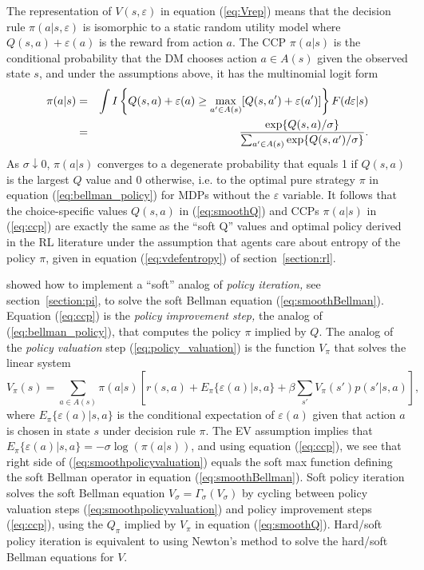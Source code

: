 The representation of $V(s,\varepsilon)$ in equation (\ref{eq:Vrep}) means that the decision rule $\pi(a|s,\varepsilon)$ 
is isomorphic to a static random utility model where $Q(s,a)+\varepsilon(a)$ is the reward from action $a$.
The CCP $\pi(a|s)$ is the conditional probability that the DM chooses action $a \in A(s)$
given the observed state $s$, and under the assumptions above, it has the multinomial logit form
\begin{eqnarray}
     \pi(a|s)  & =& \int I\left\{Q(s,a)+\varepsilon(a) \ge \max_{a' \in A(s)}[Q(s,a')+\varepsilon(a')]\right\}F(d\varepsilon|s)\nonumber \\
 &=&{ \exp\{Q(s,a)/\sigma\} \over \sum_{a' \in A(s)} \exp\{Q(s,a')/\sigma\}}.
\label{eq:ccp}
\end{eqnarray}
As $\sigma \downarrow 0$, $\pi(a|s)$ converges to a degenerate probability that equals 1 if 
$Q(s,a)$ is the largest $Q$ value  and 0 otherwise, i.e. to the optimal pure strategy $\pi$
 in equation (\ref{eq:bellman_policy}) for MDPs without the  $\varepsilon$ variable.
It follows that the choice-specific values $Q(s,a)$ in (\ref{eq:smoothQ}) and CCPs $\pi(a|s)$ in (\ref{eq:ccp})
are exactly the same as the ``soft Q'' values and optimal policy derived in the RL
literature under the assumption that agents care about entropy of the policy $\pi$, given in equation
(\ref{eq:vdefentropy}) of section~\ref{section:rl}.

\citet{AguirregabiriaMira:2002} showed how to implement a ``soft'' analog of {\it policy iteration,\/} see section~\ref{section:pi},
to solve the soft Bellman equation (\ref{eq:smoothBellman}). 
Equation (\ref{eq:ccp}) is the {\it policy improvement step,\/} the analog of (\ref{eq:bellman_policy}), that computes the  policy 
$\pi$ implied by $Q$. The  analog of the {\it policy valuation\/} step (\ref{eq:policy_valuation}) is 
the function $V_\pi$ that solves the linear system
\begin{equation}
   V_\pi(s) =\sum_{a \in A(s)} \pi(a|s)[r(s,a)+E_\pi\{\varepsilon(a)|s,a\}+\beta \sum_{s'} V_\pi(s')p(s'|s,a)],
\label{eq:smoothpolicyvaluation}
\end{equation}
where $E_\pi\{\varepsilon(a)|s,a\}$ is the conditional expectation of $\varepsilon(a)$ given that action $a$ is chosen
in state $s$  under decision rule $\pi$. The EV assumption implies that
$E_\pi\{\varepsilon(a)|s,a\}=-\sigma \log(\pi(a|s))$, and using equation (\ref{eq:ccp}), we see that right side of 
(\ref{eq:smoothpolicyvaluation}) equals the soft max function defining the soft Bellman operator in equation
(\ref{eq:smoothBellman}). Soft policy iteration solves the soft Bellman equation $V_\sigma=\Gamma_\sigma(V_\sigma)$ 
by cycling between policy valuation steps (\ref{eq:smoothpolicyvaluation})
and policy improvement steps (\ref{eq:ccp}), using the $Q_\pi$ implied by $V_\pi$ in equation (\ref{eq:smoothQ}). 
Hard/soft policy iteration is equivalent to using Newton's method to solve the hard/soft Bellman equations for $V$.

